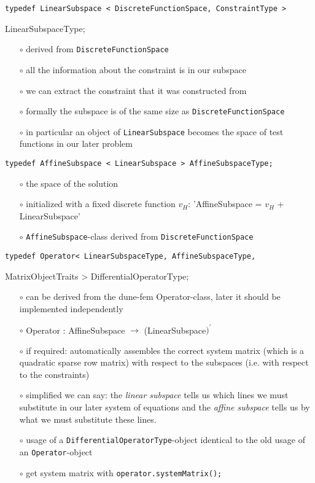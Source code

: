 \documentclass[a4paper,11pt]{article}
\numberwithin{equation}{section}
\begin{document}
{\tt typedef LinearSubspace < DiscreteFunctionSpace, ConstraintType >

\hspace{1pt}LinearSubspaceType;}
\begin{itemize}
\item[$\circ$] derived from {\tt DiscreteFunctionSpace}
\item[$\circ$] all the information about the constraint is in our subspace
\item[$\circ$] we can extract the constraint that it was constructed from
\item[$\circ$] formally the subspace is of the same size as {\tt DiscreteFunctionSpace}
\item[$\circ$] in particular an object of {\tt LinearSubspace} becomes the space of test functions in our later problem
\end{itemize}
{\tt typedef AffineSubspace < LinearSubspace > AffineSubspaceType;}
\begin{itemize}
\item[$\circ$] the space of the solution
\item[$\circ$] initialized with a fixed discrete function $v_H$: 'AffineSubspace = $v_H$ + LinearSubspace'
\item[$\circ$] {\tt AffineSubspace}-class derived from {\tt DiscreteFunctionSpace}
\end{itemize}
{\tt typedef Operator< LinearSubspaceType, AffineSubspaceType,

\hspace{1pt}MatrixObjectTraits > DifferentialOperatorType;}
\begin{itemize}
\item[$\circ$] can be derived from the dune-fem Operator-class, later it should be implemented independently
\item[$\circ$] Operator : AffineSubspace $\rightarrow$ (LinearSubspace$)^{\prime}$
\item[$\circ$] if required: automatically assembles the correct system matrix (which is a quadratic sparse row matrix) with respect to the subspaces (i.e. with respect to the constraints)
\item[$\circ$] simplified we can say: the {\it linear subspace} tells us which lines we must substitute in our later system of equations and the {\it affine subspace} tells us by what we must substitute these lines.
\item[$\circ$] usage of a {\tt DifferentialOperatorType}-object identical to the old usage of an {\tt Operator}-object
\item[$\circ$] get system matrix with {\tt operator.systemMatrix();}
\end{itemize}
\end{document}
